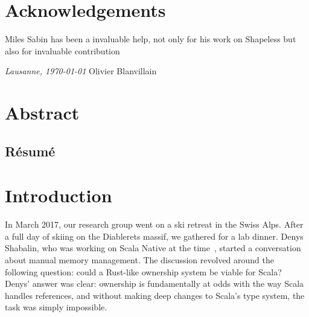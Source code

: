 



\frontmatter

\setcounter{page}{0}

\chapter{Acknowledgements}
\lipsum[1-2]
Miles Sabin has been a invaluable help, not only for his work on Shapeless but also for invaluable contribution

\bigskip
\noindent\textit{Lausanne, \today}
\hfill Olivier Blanvillain

\cleardoublepage
\chapter*{Abstract}
\lipsum[1-2] %
\begin{otherlanguage}{french}
\cleardoublepage
\chapter*{Résumé}
\lipsum[1-2]
\end{otherlanguage}

\hypersetup{linkcolor=black}
\tableofcontents
\cleardoublepage
{}
{}
\listoffigures
\hypersetup{linkcolor=purplish}
\mainmatter


\chapter{Introduction}
\label{chap:introduction}

In March 2017, our research group went on a ski retreat in the Swiss Alps.
After a full day of skiing on the Diablerets massif, we gathered for a lab dinner.
Denys Shabalin, who was working on Scala Native at the time~\citep{shabalin2020just}, started a conversation about manual memory management.
The discussion revolved around the following question: could a Rust-like ownership system be viable for Scala?
Denys' answer was clear: ownership is fundamentally at odds with the way Scala handles references, and without making deep changes to Scala's type system, the task was simply impossible.

